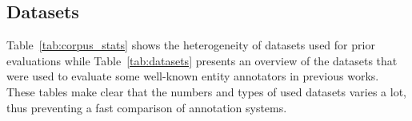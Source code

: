 
\subsection{Datasets}
\label{sec:datasets}

Table~\ref{tab:corpus_stats} shows the heterogeneity of datasets used for prior evaluations while Table~\ref{tab:datasets} presents an overview of the datasets that were used to evaluate some well-known entity annotators in previous works.
These tables make clear that the numbers and types of used datasets varies a lot, thus preventing a fast comparison of annotation systems.

%

